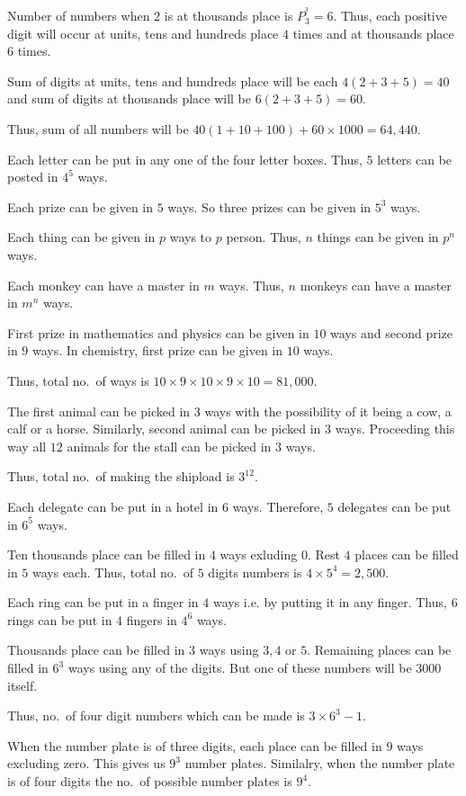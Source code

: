  Number of numbers when $2$ is at thousands place is $P_3^^3 = 6$. Thus, each positive digit will
  occur at units, tens and hundreds place $4$ times and at thousands place $6$ times.

  Sum of digits at units, tens and hundreds place will be each $4(2 + 3 + 5) = 40$ and sum of digits at
  thousands place will be $6(2 + 3 + 5) = 60$.

  Thus, sum of all numbers will be $40(1 + 10 + 100) + 60\times1000 = 64,440$.
\item Each letter can be put in any one of the four letter boxes. Thus, $5$ letters can be posted in $4^5$
  ways.
\item Each prize can be given in $5$ ways. So three prizes can be given in $5^3$ ways.
\item Each thing can be given in $p$ ways to $p$ person. Thus, $n$ things can be given in $p^n$ ways.
\item Each monkey can have a master in $m$ ways. Thus, $n$ monkeys can have a master in $m^n$ ways.
\item First prize in mathematics and physics can be given in $10$ ways and second prize in $9$ ways. In
  chemistry, first prize can be given in $10$ ways.

  Thus, total no.\ of ways is $10\times9\times10\times9\times10 = 81,000$.
\item The first animal can be picked in $3$ ways with the possibility of it being a cow, a calf or a
  horse. Similarly, second animal can be picked in $3$ ways. Proceeding this way all $12$ animals for the
  stall can be picked in $3$ ways.

  Thus, total no.\ of making the shipload is $3^{12}$.
\item Each delegate can be put in a hotel in $6$ ways. Therefore, $5$ delegates can be put in $6^5$ ways.
\item Ten thousands place can be filled in $4$ ways exluding $0$. Rest $4$ places can be filled in $5$ ways
  each. Thus, total no.\ of $5$ digits numbers is $4\times5^4 = 2,500$.
\item Each ring can be put in a finger in $4$ ways i.e. by putting it in any finger. Thus, $6$ rings can be
  put in $4$ fingers in $4^6$ ways.
\item Thousands place can be filled in $3$ ways using $3, 4$ or $5$. Remaining places can be filled in $6^3$
  ways using any of the digits. But one of these numbers will be $3000$ itself.

  Thus, no.\ of four digit numbers which can be made is $3\times6^3 - 1$.
\item When the number plate is of three digits, each place can be filled in $9$ ways excluding zero. This
  gives us $9^3$ number plates. Similalry, when the number plate is of four digits the no.\ of possible
  number plates is $9^4$.

